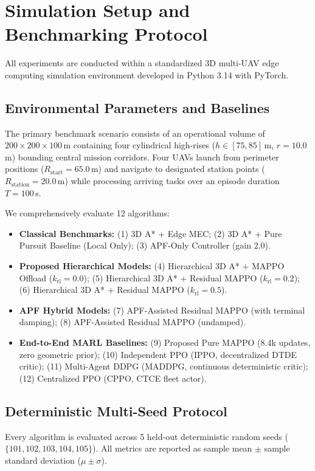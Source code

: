 \documentclass[conference]{IEEEtran}
\begin{document}
\section{Simulation Setup and Benchmarking Protocol}
\label{sec:simulation_setup}

All experiments are conducted within a standardized 3D multi-UAV edge computing simulation environment developed in Python 3.14 with PyTorch.

\subsection{Environmental Parameters and Baselines}
The primary benchmark scenario consists of an operational volume of $200 \times 200 \times 100$\,m containing four cylindrical high-rises ($h \in [75, 85]$\,m, $r = 10.0$\,m) bounding central mission corridors. Four UAVs launch from perimeter positions ($R_{\text{start}} = 65.0$\,m) and navigate to designated station points ($R_{\text{station}} = 20.0$\,m) while processing arriving tasks over an episode duration $T = 100$\,s.

We comprehensively evaluate 12 algorithms:
\begin{itemize}
    \item \textbf{Classical Benchmarks:} (1) 3D A* + Edge MEC; (2) 3D A* + Pure Pursuit Baseline (Local Only); (3) APF-Only Controller (gain $2.0$).
    \item \textbf{Proposed Hierarchical Models:} (4) Hierarchical 3D A* + MAPPO Offload ($k_{\text{rl}} = 0.0$); (5) Hierarchical 3D A* + Residual MAPPO ($k_{\text{rl}} = 0.2$); (6) Hierarchical 3D A* + Residual MAPPO ($k_{\text{rl}} = 0.5$).
    \item \textbf{APF Hybrid Models:} (7) APF-Assisted Residual MAPPO (with terminal damping); (8) APF-Assisted Residual MAPPO (undamped).
    \item \textbf{End-to-End MARL Baselines:} (9) Proposed Pure MAPPO (8.4k updates, zero geometric prior); (10) Independent PPO (IPPO, decentralized DTDE critic); (11) Multi-Agent DDPG (MADDPG, continuous deterministic critic); (12) Centralized PPO (CPPO, CTCE fleet actor).
\end{itemize}

\subsection{Deterministic Multi-Seed Protocol}
Every algorithm is evaluated across 5 held-out deterministic random seeds ($\{101, 102, 103, 104, 105\}$). All metrics are reported as sample mean $\pm$ sample standard deviation ($\mu \pm \sigma$).
\end{document}
